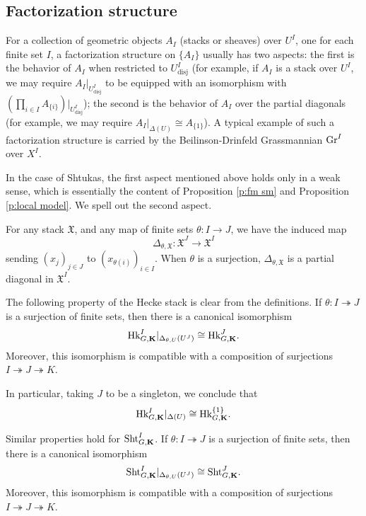\documentclass[11pt]{amsart}
\numberwithin{equation}{section}
\theoremstyle{plain}
\theoremstyle{definition}
\def\bK{\mathbf{K}}
\newcommand\frX{\mathfrak{X}}
\newcommand{\Gr}{\textup{Gr}}
\newcommand{\Hk}{\textup{Hk}}
\newcommand\Sht{\textup{Sht}}
\newcommand{\surj}{\twoheadrightarrow}
\newcommand\D\Delta
\renewcommand{\th}{\theta}
\newcommand{\disj}{\mathrm{disj}}
\begin{document}
 
\subsection{Factorization structure}\label{ss:geom fact}
For a collection of geometric objects $A_{I}$ (stacks or sheaves) over $U^{I}$, one  for each finite set $I$, a factorization structure on $\{A_{I}\}$ usually has two aspects: the first is the behavior of $A_{I}$ when restricted to $U^{I}_{\disj}$ (for example, if $A_{I}$ is a stack over $U^{I}$, we may require $A_{I}|_{U^{I}_{\disj}}$ to be equipped with an isomorphism with $(\prod_{i\in I}A_{\{i\}})|_{U^{I}_{\disj}}$); the second is the behavior of $A_{I}$ over the partial diagonals (for example, we may require $A_{I}|_{\D(U)}\cong A_{\{1\}}$).  A typical example of such a factorization structure is carried by the Beilinson-Drinfeld Grassmannian $\Gr^{I}$ over $X^{I}$. 

In the case of Shtukas, the first aspect mentioned above holds only in a weak sense, which is essentially the content of Proposition \ref{p:fm sm} and Proposition \ref{p:local model}. We spell out the second aspect.

For any stack $\frX$, and any map of finite sets $\th: I\to J$, we have the induced map
\begin{equation*}
\D_{\th, \frX}: \frX^{J}\to \frX^{I}
\end{equation*}
sending  $(x_{j})_{j\in J}$ to $(x_{\th(i)})_{i\in I}$. When $\th$ is a surjection, $\D_{\th,\frX}$ is a partial diagonal in $\frX^{I}$.


The following property of the Hecke stack is clear from the definitions. If $\th: I\surj J$ is a surjection of finite sets, then there is a canonical isomorphism
\begin{equation}\label{Hk diagonal}
\Hk^{I}_{G,\bK}|_{\D_{\th,U}(U^{J})}\cong \Hk^{J}_{G,\bK}.
\end{equation}
Moreover, this isomorphism is compatible with a composition of surjections $I\surj J\surj K$.

In particular, taking $J$ to be a singleton, we conclude that
\begin{equation*}
\Hk^{I}_{G,\bK}|_{\D(U)}\cong \Hk^{\{1\}}_{G,\bK}.
\end{equation*}


Similar properties hold for $\Sht^{I}_{G,\bK}$. If $\th: I\surj J$ is a surjection of finite sets, then there is a canonical isomorphism
\begin{equation*}
\Sht^{I}_{G,\bK}|_{\D_{\th,U}(U^{J})}\cong \Sht^{J}_{G,\bK}.
\end{equation*}
Moreover, this isomorphism is compatible with a composition of surjections $I\surj J\surj K$.
\end{document}
